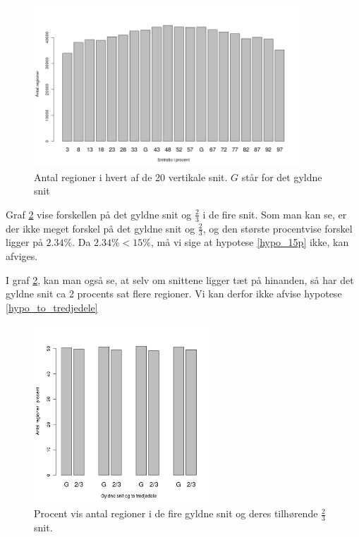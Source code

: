 {\begin{figure}[h!]
	\begin{center}
		\includegraphics[width=0.9\textwidth]{afsnit/resultater/billeder/cut0cut1eatsperratio.png}
	\end{center}
	\caption{Antal regioner i hvert af de 20 vertikale snit. $G$ står for det gyldne snit}
	\label{antal_regioner_vertikale_cut}
\end{figure}

Graf \ref{G_vs_to_trejedele} vise forskellen på det gyldne snit og
$\frac{2}{3}$ i de fire snit. Som man kan se, er der ikke meget forskel
på det gyldne snit og $\frac{2}{3}$, og den største procentvise forskel
ligger på $2.34\%$. Da $2.34 \% < 15\%$, må vi sige at hypotese
\ref{hypo_15p} ikke, kan afviges.

I graf \ref{G_vs_to_trejedele}, kan man også se, at selv om snittene
ligger tæt på hinanden, så har det gyldne snit ca 2 procents sat
flere regioner. Vi kan derfor ikke afvise hypotese
\ref{hypo_to_tredjedele}

\begin{figure}[h!]
	\begin{center}
		\includegraphics[width=0.6\textwidth]{afsnit/resultater/billeder/G_vs_to_tredjedele.png}
	\end{center}
	\caption{Procent vis antal regioner i de fire gyldne snit og deres tilhørende $\frac{2}{3}$ snit.}
	\label{G_vs_to_trejedele}
\end{figure}

}
